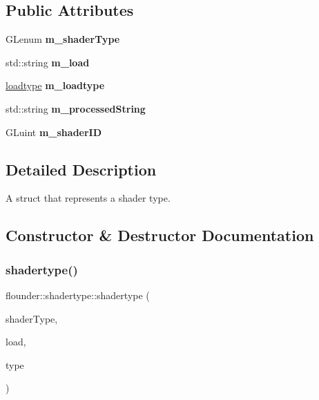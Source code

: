 \subsection*{Public Attributes}
\begin{DoxyCompactItemize}
\item 
\mbox{\label{structflounder_1_1shadertype_a0533b77290795dd20aceffb5d68aa030}} 
G\+Lenum {\bfseries m\+\_\+shader\+Type}
\item 
\mbox{\label{structflounder_1_1shadertype_a42a77a9e359645f11eb780674c91c99d}} 
std\+::string {\bfseries m\+\_\+load}
\item 
\mbox{\label{structflounder_1_1shadertype_a3e93a4cb120827562d8dea2d51594c0e}} 
\hyperlink{namespaceflounder_a69b4e6ffcd64f6175546ca0942d18565}{loadtype} {\bfseries m\+\_\+loadtype}
\item 
\mbox{\label{structflounder_1_1shadertype_a73d54a170e842d9c6a4a1064a3c43516}} 
std\+::string {\bfseries m\+\_\+processed\+String}
\item 
\mbox{\label{structflounder_1_1shadertype_aad36aedac97bf69bc34e168333ce7309}} 
G\+Luint {\bfseries m\+\_\+shader\+ID}
\end{DoxyCompactItemize}


\subsection{Detailed Description}
A struct that represents a shader type. 



\subsection{Constructor \& Destructor Documentation}
\mbox{\label{structflounder_1_1shadertype_ab07bba0e24d93987008aba47fab39187}} 
\subsubsection{\texorpdfstring{shadertype()}{shadertype()}}
{\footnotesize\ttfamily flounder\+::shadertype\+::shadertype (\begin{DoxyParamCaption}\item[{const G\+Lenum \&}]{shader\+Type,  }\item[{const std\+::string \&}]{load,  }\item[{const \hyperlink{namespaceflounder_a69b4e6ffcd64f6175546ca0942d18565}{loadtype} \&}]{type }\end{DoxyParamCaption})\hspace{0.3cm}{\ttfamily [inline]}}



